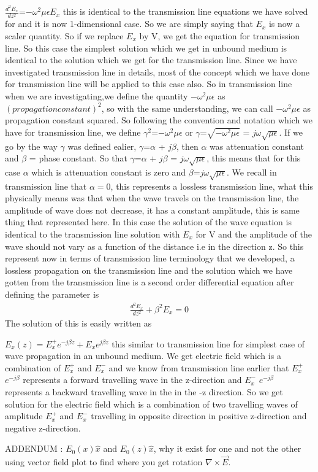 $\frac{d^2 E_x}{d z^2}$=$-\omega^2\mu\epsilon E_{x}$ this is identical to the transmission line equations we have solved for and it is now 1-dimensional case. So we are simply saying that $E_x$ is now a scaler quantity. So if we replace  $E_x$ by V, we get the equation for transmission line. So  this case the simplest solution which we get in unbound medium is identical to the solution which we get for the transmission line. Since we have investigated transmission line in details, most of the concept which we have done for transmission line will be applied to this case also. So in transmission line when we are investigating,we define the quantity $-\omega^2\mu\epsilon$ as $(propagation constant)^2$,  so with the same understanding, we can call $-\omega^2\mu\epsilon$ as  propagation constant squared. So following the convention and notation which we have for transmission line, we define $\gamma^2$=$-\omega^2\mu\epsilon$ or $\gamma$=$\sqrt{-\omega^2\mu\epsilon}$ = $j\omega\sqrt{\mu\epsilon}$. If we go by the way $\gamma$ was defined ealier, $\gamma$=$\alpha$ + $j\beta$, then $\alpha$ was attenuation constant and $\beta$ = phase constant. So that  $\gamma$=$\alpha$ + $j\beta$ = $j\omega\sqrt{\mu\epsilon}$, this means that for this case $\alpha$ which is attenuation constant is zero and    $\beta$=$j\omega\sqrt{\mu\epsilon}$.
We recall in transmission line that $\alpha=0$, this represents a lossless transmission line, what this physically means was that  when the wave travels on the transmission line, the amplitude of wave does not decrease, it has a constant amplitude, this is same thing that represented here. In this case the solution of the wave equation is identical to the transmission line solution with $E_x$ for V and the amplitude of the wave should not vary as a function of the distance i.e in the direction z. So this represent now in terms of transmission line terminology that we developed, a lossless propagation on the transmission line and the solution which we have gotten from the transmission line is a second order differential equation after defining the parameter is
\begin{align}
\frac{d^2E_x}{dz^2}+\beta^2E_x=0
\end{align}
The solution of this is easily written as

$E_x(z)=E^+_xe^{-j\beta z}+E_xe^{j\beta z}$  this similar to transmission line for simplest case of wave propagation in an unbound medium.
We get electric field which is a combination of $E_x^+$ and  $E_x^-$ and we know from transmission line earlier that  $E_x^+$ $e^{-j\beta}$ represents a forward travelling wave in the z-direction and  $E_x^-$ $e^{-j\beta}$ represents a backward travelling wave in the in the -z direction. So we get solution for the electric field which is a combination of two travelling waves of amplitude $E_x^+$ and $E_x^-$ travelling in opposite direction in positive z-direction and negative z-direction.

ADDENDUM : $E_0(x)\hat{x}$ and $E_0(z)\hat{x}$, why it exist for one and not the other using vector field plot to find where you get rotation $\nabla\times\vec{E}$.